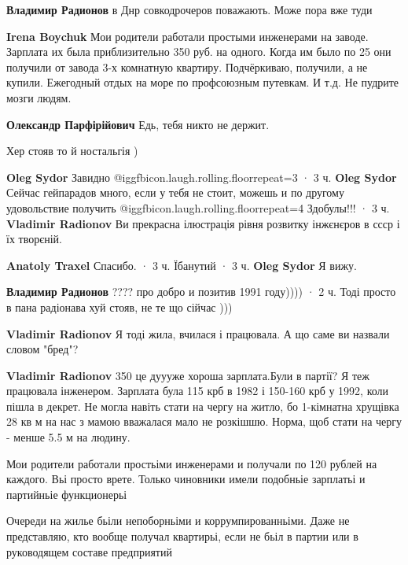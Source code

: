 \begin{itemize}
\begin{itemize}
\textbf{Владимир Радионов} в Днр совкодрочеров поважають. Може пора вже туди

\textbf{Irena Boychuk} Мои родители работали простыми инженерами на заводе. Зарплата их была приблизительно 350 руб. на одного. Когда им было по 25 они получили от завода 3-х комнатную квартиру. Подчёркиваю, получили, а не купили. Ежегодный отдых на море по профсоюзным путевкам. И т.д. Не пудрите мозги людям.

\textbf{Олександр Парфірійович} Едь, тебя никто не держит.

Хер стояв то й ностальгія )

\textbf{Oleg Sydor} Завидно @igg{fbicon.laugh.rolling.floor}{repeat=3} 
 · 3 ч.
\textbf{Oleg Sydor} Сейчас гейпарадов много, если у тебя не стоит, можешь и по другому удовольствие получить @igg{fbicon.laugh.rolling.floor}{repeat=4} 
Здобулы!!!
 · 3 ч.
\textbf{Vladimir Radionov} Ви прекрасна ілюстрація рівня розвитку інжєнєров в ссср і їх творєній.

\textbf{Anatoly Traxel} Спасибо.
 · 3 ч.
Їбанутий
 · 3 ч.
\textbf{Oleg Sydor} Я вижу.

\textbf{Владимир Радионов} ???? про добро и позитив 1991 году))))
 · 2 ч.
Тоді просто в пана радіонава хуй стояв, не те що сійчас )))

\textbf{Vladimir Radionov} Я тоді жила, вчилася і працювала. А що саме ви назвали словом "бред"?

\textbf{Vladimir Radionov} 350 це дуууже хороша зарплата.Були в партії? Я теж працювала інженером. Зарплата була 115 крб в 1982 і 150-160 крб у 1992, коли пішла в декрет. Не могла навіть стати на чергу на житло, бо 1-кімнатна хрущівка 28 кв м на нас з мамою вважалася мало не розкішшю. Норма, щоб стати на чергу - менше 5.5 м на людину.

Мои родители работали простьіми инженерами и получали по 120 рублей на каждого. Вьі просто врете. Только чиновники имели подобньіе зарплатьі и партийньіе функционерьі

Очереди на жилье бьіли непоборньіми и коррумпированньіми. Даже не представляю, кто вообще получал квартирьі, если не бьіл в партии или в руководящем составе предприятий


\end{itemize}
\end{itemize}
